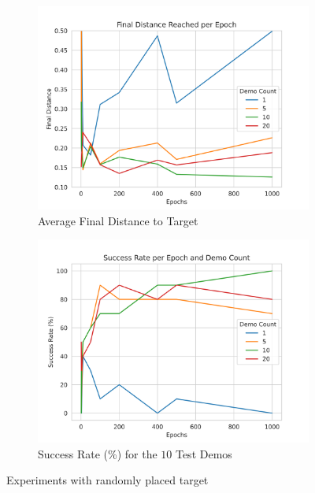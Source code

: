 \begin{figure}[htpb] %
  \begin{subfigure}{0.50\linewidth}
    \centering
    \includegraphics[width=\linewidth]{assets/cam-comb/reach-no-obs/rno_random-dist.png}
    \caption{Average Final Distance to Target}\label{subfig:rno-random-dist}
  \end{subfigure}
  \hfill
  \begin{subfigure}{0.50\linewidth}
    \centering
    \includegraphics[width=\linewidth]{assets/cam-comb/reach-no-obs/rno_random-success.png}
    \caption{Success Rate (\%) for the $10$ Test Demos}\label{subfig:rno-random-success}
  \end{subfigure}
  \caption{Experiments with randomly placed target}\label{fig:rno-random}
\end{figure}

